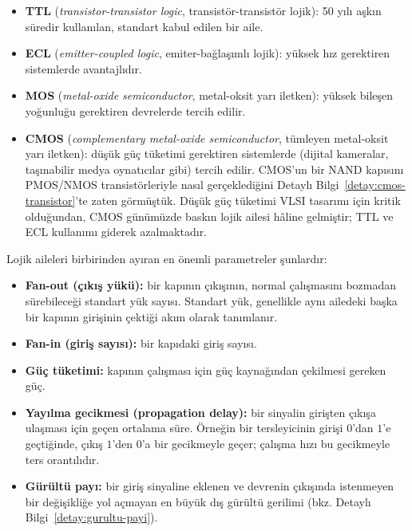 \begin{itemize}[nosep]
    \item \textbf{TTL} (\emph{transistor-transistor logic}, transistör-transistör
    lojik): 50 yılı aşkın süredir kullanılan, standart kabul edilen bir aile.
    \item \textbf{ECL} (\emph{emitter-coupled logic}, emiter-bağlaşımlı lojik):
    yüksek hız gerektiren sistemlerde avantajlıdır.
    \item \textbf{MOS} (\emph{metal-oxide semiconductor}, metal-oksit yarı iletken):
    yüksek bileşen yoğunluğu gerektiren devrelerde tercih edilir.
    \item \textbf{CMOS} (\emph{complementary metal-oxide semiconductor}, tümleyen
    metal-oksit yarı iletken): düşük güç tüketimi gerektiren sistemlerde (dijital
    kameralar, taşınabilir medya oynatıcılar gibi) tercih edilir. CMOS'un bir NAND
    kapısını PMOS/NMOS transistörleriyle nasıl gerçeklediğini Detaylı
    Bilgi~\ref{detay:cmos-transistor}'te zaten görmüştük. Düşük güç tüketimi VLSI
    tasarımı için kritik olduğundan, CMOS günümüzde baskın lojik ailesi hâline
    gelmiştir; TTL ve ECL kullanımı giderek azalmaktadır.
\end{itemize}

Lojik aileleri birbirinden ayıran en önemli parametreler şunlardır:

\begin{itemize}[nosep]
    \item \textbf{Fan-out (çıkış yükü):} bir kapının çıkışının, normal çalışmasını
    bozmadan sürebileceği standart yük sayısı. Standart yük, genellikle aynı ailedeki
    başka bir kapının girişinin çektiği akım olarak tanımlanır.
    \item \textbf{Fan-in (giriş sayısı):} bir kapıdaki giriş sayısı.
    \item \textbf{Güç tüketimi:} kapının çalışması için güç kaynağından çekilmesi
    gereken güç.
    \item \textbf{Yayılma gecikmesi (propagation delay):} bir sinyalin girişten
    çıkışa ulaşması için geçen ortalama süre. Örneğin bir tersleyicinin girişi
    $0$'dan $1$'e geçtiğinde, çıkış $1$'den $0$'a bir gecikmeyle geçer; çalışma hızı
    bu gecikmeyle ters orantılıdır.
    \item \textbf{Gürültü payı:} bir giriş sinyaline eklenen ve devrenin çıkışında
    istenmeyen bir değişikliğe yol açmayan en büyük dış gürültü gerilimi (bkz.
    Detaylı Bilgi~\ref{detay:gurultu-payi}).
\end{itemize}
